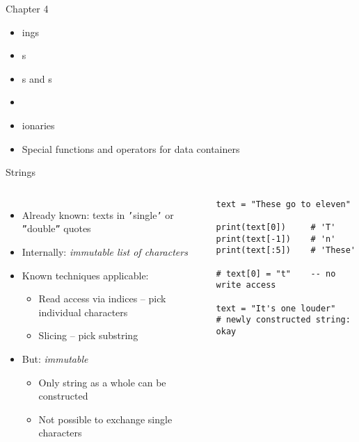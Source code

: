 
\begin{frame}[fragile]{Chapter 4}
%
\begin{itemize}
\item {}ings
\item {}s
\item {}s and s
\item {}
\item {}ionaries
\item Special functions and operators for data containers
\end{itemize}
%
\end{frame}


\begin{frame}[fragile]{Strings}
%
\begin{columns}[T]
\begin{itemize}
\item Already known: texts in \texttt{'}single\texttt{'} or \texttt{''}double\texttt{''} quotes
\item Internally: \emph{immutable list of characters}
\item Known techniques applicable:
	\begin{itemize}
	\item Read access via indices -- pick individual characters
	\item Slicing -- pick substring
	\end{itemize}
\item But: \emph{immutable}
	\begin{itemize}
	\item Only string as a whole can be constructed
	\item Not possible to exchange single characters
	\end{itemize}
\end{itemize}
%
\begin{codebox}
\begin{verbatim}
text = "These go to eleven"

print(text[0])     # 'T'
print(text[-1])    # 'n'
print(text[:5])    # 'These'

# text[0] = "t"    -- no write access

text = "It's one louder" 
# newly constructed string: okay
\end{verbatim}
\end{codebox}
\end{columns}
%
\end{frame}

